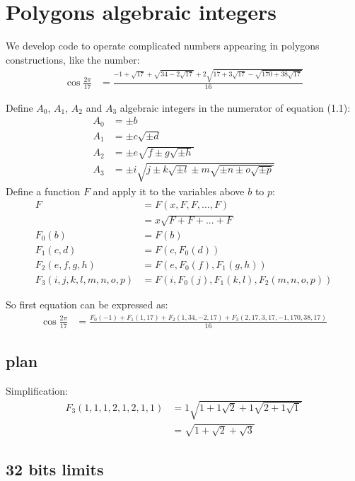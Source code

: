 \documentclass{article}
\begin{document}
\section{Polygons algebraic integers}
We develop code to operate complicated numbers appearing in polygons constructions, like the number:
\begin{align}
\cos{\frac{2\pi}{17}} &=
\frac{-1+\sqrt{17}+\sqrt{34-2\sqrt{17}}+2\sqrt{17+3\sqrt{17}-\sqrt{170+38\sqrt{17}}}}{16}
\end{align}

Define $A_0$, $A_1$, $A_2$ and $A_3$ algebraic integers in the numerator of equation (1.1):
\begin{align}
A_0 &= \pm b\\
A_1 &= \pm c\sqrt{\pm d}\\
A_2 &= \pm e\sqrt{f \pm g\sqrt{\pm h}}\\
A_3 &= \pm i\sqrt{j \pm k\sqrt{\pm l} \pm m\sqrt{\pm n \pm o\sqrt{\pm p}}}
\end{align}
Define a function $F$ and apply it to the variables above $b$ to $p$:
\begin{align}
 F &= F(x,F,F,...,F)\\
   &= x\sqrt{F + F + ... + F}\\
 F_0(b) &= F(b)\\
 F_1(c,d) &= F(c,F_0(d))\\
 F_2(e,f,g,h) &= F(e,F_0(f),F_1(g,h))\\
 F_3(i,j,k,l,m,n,o,p) &= F(i,F_0(j),F_1(k,l),F_2(m,n,o,p))
\end{align}

So first equation can be expressed as:
\begin{align}
\cos{\frac{2\pi}{17}} &=
\frac{F_0(-1) + F_1(1,17) + F_2(1,34,-2,17) + F_3(2,17,3,17,-1,170,38,17)}{16}
\end{align}

\subsection{plan}
Simplification:
\begin{align}
F_3(1,1,1,2,1,2,1,1) &= 1\sqrt{1+1\sqrt{2}+1\sqrt{2+1\sqrt{1}}}\\
 &= \sqrt{1 + \sqrt{2} + \sqrt{3}}
\end{align}




\subsection{32 bits limits}
\end{document}
